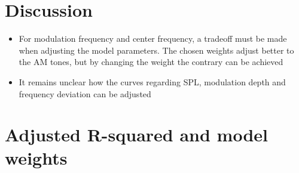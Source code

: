 \documentclass{article}
\begin{document}
\section{Discussion}
\label{sec:discussion}

\begin{itemize}
  \item For modulation frequency and center frequency, a tradeoff must be made
  when adjusting the model parameters. The chosen weights adjust better to the
  AM tones, but by changing the weight the contrary can be achieved
  \item It remains unclear how the curves regarding SPL, modulation depth and
  frequency deviation can be adjusted
\end{itemize}

\mybibliography{}

\clearpage

\appendix

\section{Adjusted R-squared and model weights}

\end{document}
